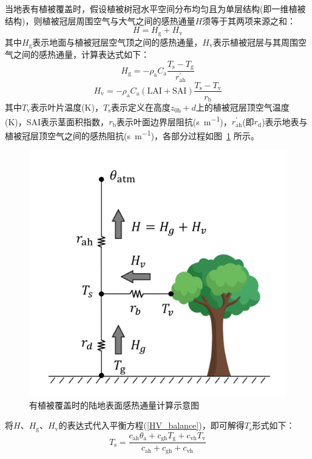 当地表有植被覆盖时，假设植被树冠水平空间分布均匀且为单层结构(即一维植被结构)，则植被冠层周围空气与大气之间的感热通量$H$须等于其两项来源之和：
\begin{equation}\label{HV_balance}
  H=H_{\mathrm{g}}+H_{\mathrm{v}}
\end{equation}
其中$H_{\mathrm{g}}$表示地面与植被冠层空气顶之间的感热通量，$H_{\mathrm{v}}$表示植被冠层与其周围空气之间的感热通量，计算表达式如下：
\begin{equation}
  H_{\mathrm{g}}=-\rho_{\mathrm{a}} C_{\mathrm{a}} \frac{T_{\mathrm{s}}-T_{\mathrm{g}}}{r_{\mathrm{a h}}^{\prime}}
\end{equation}
\begin{equation}
  H_{\mathrm{v}}=-\rho_{\mathrm{a}} C_{\mathrm{a}}(\text {LAI}+\text {SAI}) \frac{T_{\mathrm{s}}-T_{\mathrm{v}}}{r_{\mathrm{b}}}
\end{equation}
其中$T_{\mathrm {v}}$表示叶片温度(K)，$T_{\mathrm {s}}$表示定义在高度$z_{\mathrm{0h}}+d$上的植被冠层顶空气温度(K)，SAI表示茎面积指数，$r_{\mathrm {b}}$表示叶面边界层阻抗(\unit{s.m^{-1}})，$r_{\mathrm{ah}}^\prime$(即$r_{\mathrm {d}}$)表示地表与植被冠层顶空气之间的感热阻抗(\unit{s.m^{-1}})，各部分过程如图~\ref{fig:有植被覆盖部分的陆地表面感热通量示意图} 所示。
{
  \begin{figure}[htbp]
    \centering
    \includegraphics[width=0.6\linewidth]{Figures/地表湍流交换过程/有植被感热交换阻抗示意图.png}
    \caption{有植被覆盖时的陆地表面感热通量计算示意图}
    \label{fig:有植被覆盖部分的陆地表面感热通量示意图}
  \end{figure}
}
将$H$、$H_{\mathrm{g}}$、$H_{\mathrm{v}}$的表达式代入平衡方程(\ref{HV_balance})，即可解得$T_{\mathrm {s}}$形式如下：
\begin{equation}
  T_{\mathrm{s}}=\frac{c_{\mathrm{ah}} \theta_{\mathrm{a}}+c_{\mathrm{gh}} T_{\mathrm{g}}+c_{\mathrm{vh}} T_{\mathrm{v}}}{c_{\mathrm{ah}}+c_{\mathrm{gh}}+c_{\mathrm{vh}}}
\end{equation}
